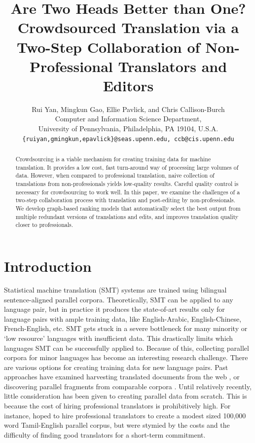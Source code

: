 \documentclass[11pt]{article}
\title{Are Two Heads Better than One? Crowdsourced Translation via a \\Two-Step Collaboration of Non-Professional Translators and Editors}
\author{Rui Yan, Mingkun Gao, Ellie Pavlick, and Chris Callison-Burch \\
Computer and Information Science Department, \\
University of Pennsylvania, Philadelphia, PA 19104, U.S.A.\\
\normalsize{{\tt \{ruiyan,gmingkun,epavlick\}@seas.upenn.edu, ccb@cis.upenn.edu}}}
\date{}
\begin{document}
\maketitle
\begin{abstract}
  Crowdsourcing is a viable mechanism for creating training data for machine translation.  It provides a low cost, fast turn-around way of processing large volumes of data. However, when compared to professional translation, naive collection of translations from non-professionals yields low-quality results. Careful quality control is necessary for crowdsourcing to work well. In this paper, we examine the challenges of a two-step collaboration process with translation and post-editing by non-professionals.  We develop graph-based ranking models that automatically select the best output from multiple redundant versions of translations and edits, and improves translation quality closer to professionals.
\end{abstract}

\section{Introduction}

Statistical machine translation (SMT) systems are trained using bilingual sentence-aligned parallel corpora.  Theoretically, SMT can be applied to any language pair, but in practice it produces the state-of-art results only for language pairs with ample training data, like English-Arabic, English-Chinese, French-English, etc.  SMT gets stuck in a severe bottleneck for many minority or `low resource' languages with insufficient data.
This drastically limits which languages SMT can be successfully applied to.
Because of this, collecting parallel corpora for minor languages has become an interesting research challenge. There are various options for creating training data for new language pairs.  Past approaches have examined harvesting translated documents from the web \cite{a10,a13,smith-EtAl:2013:ACL}, or discovering parallel fragments from comparable corpora \cite{a11,abdulrauf-schwenk:2009:EACL,a12}.
Until relatively recently, little consideration has been given to creating parallel data from scratch.  This is because the cost of hiring professional translators is prohibitively high.  For instance,  hoped to hire professional translators to create a modest sized 100,000 word Tamil-English parallel corpus, but were stymied by the costs and the difficulty of finding good translators for a short-term commitment.
\end{document}

